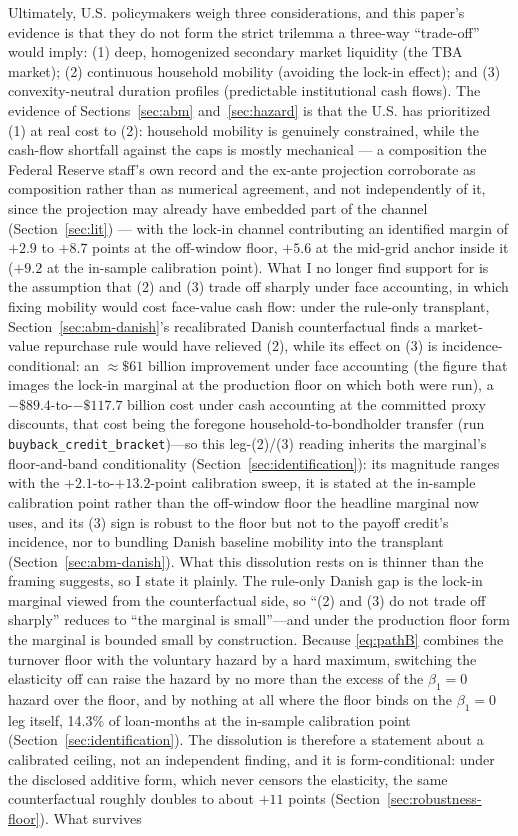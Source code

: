 \documentclass[12pt]{article}
\begin{document}
Ultimately, U.S. policymakers weigh three considerations, and this paper's evidence is that they do not form the strict trilemma a three-way ``trade-off'' would imply: (1) deep, homogenized secondary market liquidity (the TBA market); (2) continuous household mobility (avoiding the lock-in effect); and (3) convexity-neutral duration profiles (predictable institutional cash flows). The evidence of Sections~\ref{sec:abm} and~\ref{sec:hazard} is that the U.S. has prioritized (1) at real cost to (2): household mobility is genuinely constrained, while the cash-flow shortfall against the caps is mostly mechanical --- a composition the Federal Reserve staff's own record and the ex-ante projection corroborate as composition rather than as numerical agreement, and not independently of it, since the projection may already have embedded part of the channel (Section~\ref{sec:lit}) --- with the lock-in channel contributing an identified margin of $+2.9$ to $+8.7$ points at the off-window floor, $+5.6$ at the mid-grid anchor inside it ($+9.2$ at the in-sample calibration point). What I no longer find support for is the assumption that (2) and (3) trade off sharply under face accounting, in which fixing mobility would cost face-value cash flow: under the rule-only transplant, Section~\ref{sec:abm-danish}'s recalibrated Danish counterfactual finds a market-value repurchase rule would have relieved (2), while its effect on (3) is incidence-conditional: an $\approx\$61$ billion improvement under face accounting (the figure that images the lock-in marginal at the production floor on which both were run), a $-\$89.4$-to-$-\$117.7$ billion cost under cash accounting at the committed proxy discounts, that cost being the foregone household-to-bondholder transfer (run \texttt{buyback\_credit\_bracket})---so this leg-(2)/(3) reading inherits the marginal's floor-and-band conditionality (Section~\ref{sec:identification}): its magnitude ranges with the $+2.1$-to-$+13.2$-point calibration sweep, it is stated at the in-sample calibration point rather than the off-window floor the headline marginal now uses, and its (3) sign is robust to the floor but not to the payoff credit's incidence, nor to bundling Danish baseline mobility into the transplant (Section~\ref{sec:abm-danish}). What this dissolution rests on is thinner than the framing suggests, so I state it plainly. The rule-only Danish gap is the lock-in marginal viewed from the counterfactual side, so ``(2) and (3) do not trade off sharply'' reduces to ``the marginal is small''---and under the production floor form the marginal is bounded small by construction. Because \eqref{eq:pathB} combines the turnover floor with the voluntary hazard by a hard maximum, switching the elasticity off can raise the hazard by no more than the excess of the $\beta_1 = 0$ hazard over the floor, and by nothing at all where the floor binds on the $\beta_1 = 0$ leg itself, 14.3\% of loan-months at the in-sample calibration point (Section~\ref{sec:identification}). The dissolution is therefore a statement about a calibrated ceiling, not an independent finding, and it is form-conditional: under the disclosed additive form, which never censors the elasticity, the same counterfactual roughly doubles to about $+11$ points (Section~\ref{sec:robustness-floor}). What survives 
\end{document}
